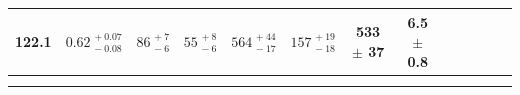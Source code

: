 \begin{table}
{\begin{tabular}{lcccccccccccc}
	
	\textbf{122.1} & $0.62_{\, -0.08}^{\, +0.07}$ & $86_{\, -6}^{\, +7}$ & $55_{\, -6}^{\, +8}$ & $564_{\, -17}^{\, +44}$ & $157_{\, -18}^{\, +19}$ & 533 $\pm$ 37 & 6.5 $\pm$ 0.8
	\\[1.5mm]
	
	\hline\\[-6.0mm]
	\hline
	\label{tab:table1}
	\end{tabular}
	}
      \end{table}
